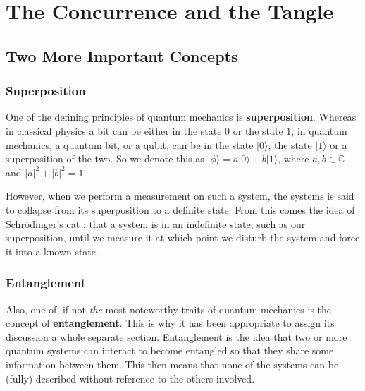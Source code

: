 \documentclass[12pt,a4paper]{article}
\numberwithin{equation}{section}
\begin{document}
\newpage







\section{The Concurrence and the Tangle}
\label{sec:mainSection}

\subsection{Two More Important Concepts}
\label{subsec:moreDefinitions}

\subsubsection{Superposition}
\label{subsubsec:superposition}

One of the defining principles of quantum mechanics is {\bf superposition}. Whereas in classical physics a bit can be either in the state $0$ or the state $1$, in quantum mechanics, a quantum bit, or a qubit, can be in the state $|0\rangle$, the state $|1\rangle$ or a superposition of the two. So we denote this as $|\phi\rangle = a|0\rangle + b|1\rangle$, where $a,b \in \mathbb{C}$ and $|a|^2 + |b|^2 = 1$.

However, when we perform a measurement on such a system, the systems is said to collapse from its superposition to a definite state. From this comes the idea of Schr\"{o}dinger's cat \cite{SCat}: that a system is in an indefinite state, such as our superposition, until we measure it at which point we disturb the system and force it into a known state.

\vskip 2mm

\subsubsection{Entanglement}
\label{subsubsec:entanglement}

Also, one of, if not \emph{the} most noteworthy traits of quantum mechanics is the concept of {\bf entanglement}. This is why it has been appropriate to assign its discussion a whole separate section. Entanglement is the idea that two or more quantum systems can interact to become entangled so that they share some information between them. This then means that none of the systems can be (fully) described without reference to the others involved.
\end{document}
